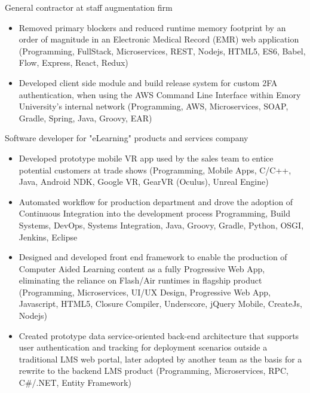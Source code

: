 \divider




General contractor at staff augmentation firm

\begin{itemize}
  \item Removed primary blockers and reduced runtime memory footprint by an order of magnitude in an Electronic Medical Record (EMR) web application {\tiny (Programming, FullStack, Microservices, REST, Nodejs, HTML5, ES6, Babel, Flow, Express, React, Redux)}
\end{itemize}

\begin{itemize}
  \item Developed client side module and build release system for custom 2FA authentication, when using the AWS Command Line Interface within Emory University’s internal network {\tiny (Programming, AWS, Microservices, SOAP, Gradle, Spring, Java, Groovy, EAR)}
\end{itemize}

\divider




Software developer for "eLearning" products and services company

\begin{itemize}
  \item Developed prototype mobile VR app used by the sales team to entice potential customers at trade shows {\tiny (Programming, Mobile Apps, C/C++, Java, Android NDK, Google VR, GearVR (Oculus), Unreal Engine)}
  \item Automated workflow for production department and drove the adoption of Continuous Integration into the development process {\tiny Programming, Build Systems, DevOps, Systems Integration, Java, Groovy, Gradle, Python, OSGI, Jenkins, Eclipse}
  \item Designed and developed front end framework to enable the production of Computer Aided Learning content as a fully Progressive Web App, eliminating the reliance on Flash/Air runtimes in flagship product {\tiny (Programming, Microservices, UI/UX Design, Progressive Web App, Javascript, HTML5, Closure Compiler, Underscore, jQuery Mobile, CreateJs, Nodejs) }
  \item Created prototype data service-oriented back-end architecture that supports user authentication and tracking for deployment scenarios outside a traditional LMS web portal, later adopted by another team as the basis for a rewrite to the backend LMS product {\tiny (Programming, Microservices, RPC, C#/.NET, Entity Framework)}
\end{itemize}

